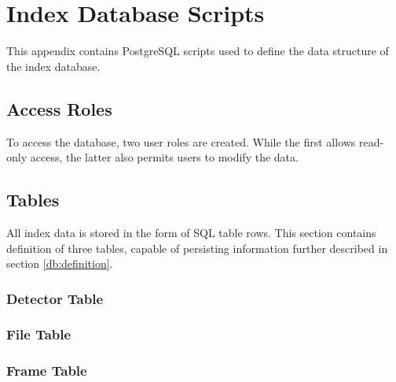 \chapter{Index Database Scripts}
This appendix contains PostgreSQL scripts used to define the data structure of the index database.

\section{Access Roles}
To access the database, two user roles are created. While the first allows read-only access, the latter also permits users to modify the data.
~

\section{Tables}
All index data is stored in the form of SQL table rows. This section contains definition of three tables, capable of persisting information further described in section \ref{db:definition}.

\subsection{Detector Table}

\subsection{File Table}

\subsection{Frame Table}
